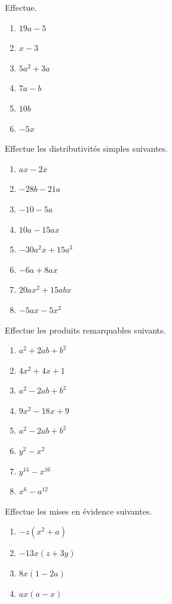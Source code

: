 \documentclass[12pt,parskip=half-, twoside=semi]{scrartcl}
\begin{document}
\setcounter{exercise}{0}
\begin{exercise} Effectue.
  \begin{enumerate}[cols=3]
      \item \(19a-5\)
      \item \(x-3\)
      \item \(5a^2+3a\)
      \item \(7a-b\)
      \item \(10b\)
      \item \(-5x\)
  \end{enumerate}
\end{exercise}

\begin{exercise} Effectue les distributivités simples suivantes.
  \begin{enumerate}[cols=2]
    \item $ax-2x$
    \item $-28b-21a$
    \item $-10-5a$
    \item $10a-15ax$
    \item $-30a^2x+15a^3$
    \item $-6a+8ax$
    \item $20ax^2+15abx$
    \item $-5ax-5x^2$
  \end{enumerate}
\end{exercise}

\begin{exercise} Effectue les produits remarquables suivants.
  \begin{enumerate}[cols=2]
    \item $a^2+2ab+b^2$
    \item $4x^2+4x+1$
    \item $a^2-2ab+b^2$
    \item $9x^2-18x+9$
    \item $a^2-2ab+b^2$
    \item $y^2-x^2$
    \item $y^{14}-x^{16}$
    \item $x^6-a^{12}$
  \end{enumerate}
\end{exercise}

\begin{exercise} Effectue les mises en évidence suivantes.
  \begin{enumerate}[cols=2]
    \item $-z(x^2+a)$
    \item $-13x(z+3y)$
    \item $8x(1-2a)$
    \item $ax(a-x)$
  \end{enumerate}
\end{exercise}
\end{document}
